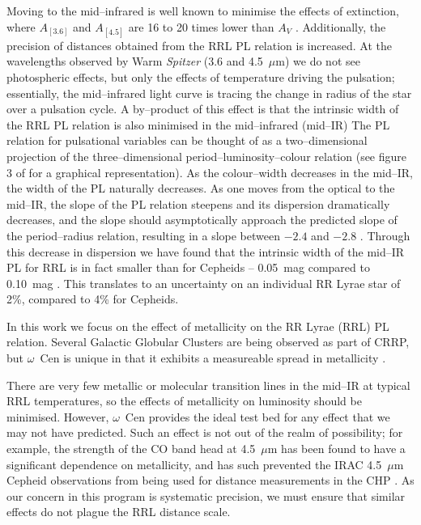 \documentclass[a4paper,fleqn,usenatbib]{mnras}
\begin{document}
Moving to the mid--infrared is well known to minimise the effects of extinction, where $A_{[3.6]}$ and $A_{[4.5]}$ are 16 to 20 times lower than $A_V$ \citet{1989ApJ...345..245C, 2005ApJ...619..931I}. Additionally, the precision of distances obtained from the RRL PL relation is increased. At the wavelengths observed by Warm \textit{Spitzer} (3.6 and 4.5~$\mu$m) we do not see photospheric effects, but only the effects of temperature driving the pulsation; essentially, the mid--infrared light curve is tracing the change in radius of the star over a pulsation cycle. A by--product of this effect is that the intrinsic width of the RRL PL relation is also minimised in the mid--infrared (mid--IR) The PL relation for pulsational variables can be thought of as a two--dimensional projection of the three--dimensional period--luminosity--colour relation (see figure 3 of \citet{1991PASP..103..933M} for a graphical representation). As the colour--width decreases in the mid--IR, the width of the PL naturally decreases. As one moves from the optical to the mid--IR, the slope of the PL relation steepens and its dispersion dramatically decreases, and the slope should asymptotically approach the predicted slope of the period--radius relation, resulting in a slope between $-2.4$ and $-2.8$ \citep{2013ApJ...776..135M}. Through this decrease in dispersion we have found that the intrinsic width of the mid--IR PL for RRL is in fact smaller than for Cepheids -- 0.05~mag compared to 0.10~mag \citep[Monson et al. 2015, in prep,][]{2015arXiv150507858N}. This translates to an uncertainty on an individual RR Lyrae star of 2\%, compared to 4\% for Cepheids. 

In this work we focus on the effect of metallicity on the RR Lyrae (RRL) PL relation. Several Galactic Globular Clusters are being observed as part of CRRP, but $\omega$~Cen is unique in that it exhibits a measureable spread in metallicity \citep{1975ApJ...201L..71F, 2007ApJ...663..296V, 2014ApJ...791..107V}.

There are very few metallic or molecular transition lines in the mid--IR at typical RRL temperatures, so the effects of metallicity on luminosity should be minimised. However, $\omega$~Cen provides the ideal test bed for any effect that we may not have predicted. Such an effect is not out of the realm of possibility; for example, the strength of the CO band head at 4.5~$\mu$m has been found to have a significant dependence on metallicity, and has such prevented the IRAC 4.5~$\mu$m Cepheid observations from being used for distance measurements in the CHP \citep{2011ApJ...743...76S, 2012ApJ...759..146M, 2015arXiv150206995S}. As our concern in this program is systematic precision, we must ensure that similar effects do not plague the RRL distance scale.  
\end{document}
